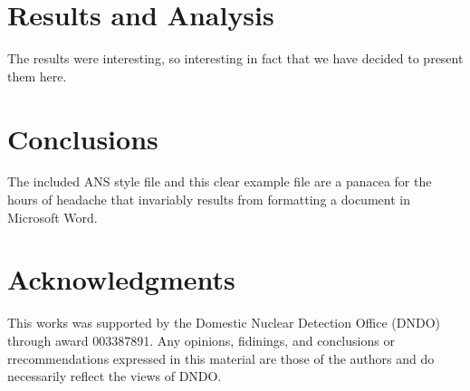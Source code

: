\documentclass{anstrans}
\begin{document}
\section{Results and Analysis}
The results were interesting, so interesting in fact that we have decided to
present them here.

\section{Conclusions}

The included ANS style file and this clear example file are a panacea for
the hours of headache that invariably results from formatting a document in
Microsoft Word.


\section{Acknowledgments}
This works was supported by the Domestic Nuclear Detection Office (DNDO) through award 003387891.
Any opinions, fidinings, and conclusions or rrecommendations expressed in this material are those of the authors and do necessarily reflect the views of DNDO.



\end{document}
